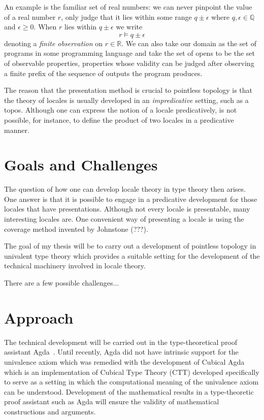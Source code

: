 \documentclass{article}
\begin{document}
An example is the familiar set of real numbers: we can never pinpoint the value of a real
number $r$, only judge that it lies within some range $q \pm \epsilon$ where $q, \epsilon \in \mathbb{Q}$
and $\epsilon \ge 0$. When $r$ lies within $q \pm \epsilon$ we write
\begin{equation*}
  r \vDash q \pm \epsilon
\end{equation*}
denoting a \emph{finite observation} on $r \in \mathbb{R}$. We can also take our domain as
the set of programs in some programming language and take the set of opens to be the set
of observable properties, properties whose validity can be judged after observing a finite
prefix of the sequence of outputs the program produces.

The reason that the presentation method is crucial to pointless topology is that the
theory of locales is usually developed in an \emph{impredicative} setting, such as a
topos. Although one can express the notion of a locale predicatively, is not possible, for
instance, to define the product of two locales in a predicative manner.

\section{Goals and Challenges}


The question of how one can develop locale theory in type theory then arises. One answer
is that it is possible to engage in a predicative development for those locales that have
presentations. Although not every locale is presentable, many interesting locales are. One
convenient way of presenting a locale is using the coverage method invented by Johnstone
(???).

The goal of my thesis will be to carry out a development of pointless topology in
univalent type theory which provides a suitable setting for the development of the
technical machinery involved in locale theory.

There are a few possible challenges...

\section{Approach}

The technical development will be carried out in the type-theoretical proof assistant
Agda~\cite{norell:2008}. Until recently, Agda did not have intrinsic support for the
univalence axiom which was remedied with the development of Cubical
Agda~\cite{cubicalagda} which is an implementation of Cubical Type Theory (CTT) developed
specifically to serve as a setting in which the computational meaning of the univalence
axiom can be understood. Development of the mathematical results in a type-theoretic proof
assistant such as Agda will ensure the validity of mathematical constructions and
arguments.
\end{document}
